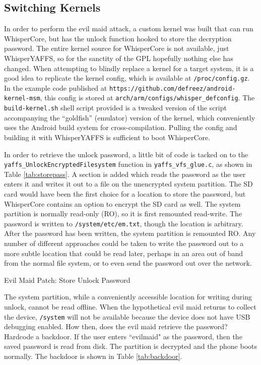 \subsection{Switching Kernels}
In order to perform the evil maid attack, a custom kernel was built that can run WhisperCore, but has the unlock function hooked
to store the decryption password.  The entire kernel source for WhisperCore is not available, just WhisperYAFFS, so for the sanctity
of the GPL hopefully nothing else has changed.  When attempting to blindly replace a kernel for a target system, it is a good idea
to replicate the kernel config, which is available at \texttt{/proc/config.gz}.  In the example code published at
\texttt{https://github.com/defreez/android-kernel-msm}, this config is stored at \texttt{arch/arm/configs/whisper\_defconfig}.  The
\texttt{build-kernel.sh} shell script provided is a tweaked version of the script accompanying the ``goldfish'' (emulator) version
of the kernel, which conveniently uses the Android build system for cross-compilation.  Pulling the config and building it with
WhisperYAFFS is sufficient to boot WhisperCore.

In order to retrieve the unlock password, a little bit of code is tacked on to the \texttt{yaffs\_UnlockEncryptedFilesystem}
function in \texttt{yaffs\_vfs\_glue.c}, as shown in Table \ref{tab:storepass}. A section is added which reads the password as the user enters it and writes it out to a
file on the unencrypted system partition.  The SD card would have been the first choice for a location to store the password, but
WhisperCore contains an option to encrypt the SD card as well. The system partition is normally read-only (RO), so it is first
remounted read-write. The password is written to \texttt{/system/etc/em.txt}, though the location is arbitrary. After the password
has been written, the system partition is remounted RO. Any number of different approaches could be taken to write the password out
to a more subtle location that could be read later, perhaps in an area out of band from the normal file system, or to even send the
password out over the network. 

\begin{table}[htb]

\caption{Evil Maid Patch: Store Unlock Password}
\label{tab:storepass}
\end{table}

The system partition, while a conveniently accessible location for writing during unlock, cannot be read offline.  When the
hypothetical evil maid returns to collect the device, \texttt{/system} will not be available because the device does not have USB
debugging enabled.  How then, does the evil maid retrieve the password? Hardcode a backdoor.  If the user enters ``evilmaid" as the
password, then the saved password is read from disk.  The partition is decrypted and the phone boots normally. The backdoor is shown in 
Table \ref{tab:backdoor}.


